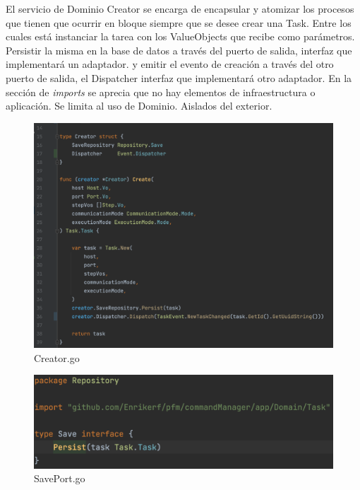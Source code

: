 El servicio de Dominio Creator se encarga de encapsular y atomizar los procesos que tienen que ocurrir en bloque siempre que se desee crear una Task.
Entre los cuales está instanciar la tarea con los ValueObjects que recibe como parámetros.
Persistir la misma en la base de datos a través del puerto de salida, interfaz que implementará un adaptador.
y emitir el evento de creación a través del otro puerto de salida, el Dispatcher interfaz que implementará otro adaptador.
En la sección de \textit{imports} se aprecia que no hay elementos de infraestructura o aplicación.
Se limita al uso de Dominio.
Aislados del exterior.

\begin{figure}[H]
    \centering
    \includegraphics[height=0.4\textheight]{./part/Ejecucion/Seguimiento/CreateTaskUseCase/img/PFM - creator}
    \caption{Creator.go}\label{fig:Creator}
\end{figure}

\begin{figure}[H]
    \centering
    \includegraphics[height=0.2\textheight]{./part/Ejecucion/Seguimiento/CreateTaskUseCase/img/PFM - SavePort}
    \caption{SavePort.go}\label{fig:SavePort}
\end{figure}

